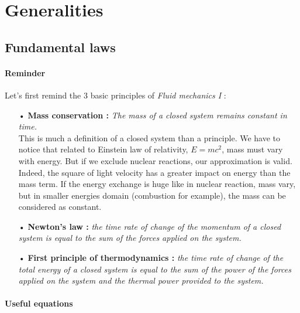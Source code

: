 
\chapter{Generalities}
\section{Fundamental laws}
\subsubsection{Reminder}
	Let's first remind the 3 basic principles of \textit{Fluid mechanics I} : \\
	
	\begin{itemize}
		\item[•] \textbf{Mass conservation :} \textit{The mass of a closed system remains constant in time.}\\
		This is much a definition of a closed system than a principle. We have to notice that related to Einstein law of relativity, $E = mc^2$, mass must vary with energy. But if we exclude nuclear reactions, our approximation is valid. Indeed, the square of light velocity has a greater impact on energy than the mass term. If the energy exchange is huge like in nuclear reaction, mass vary, but in smaller energies domain (combustion for example), the mass can be considered as constant. \\
		
		\item[•] \textbf{Newton's law :} \textit{the time rate of change of the momentum of a closed system is equal to the sum of the forces applied on the system.} \\
		
		\item[•] \textbf{First principle of thermodynamics :} \textit{the time rate of change of the total energy of a closed system is equal to the sum of the power of the forces applied on the system and the thermal power provided to the system.}
	\end{itemize}		
	
	\subsubsection{Useful equations}
	
